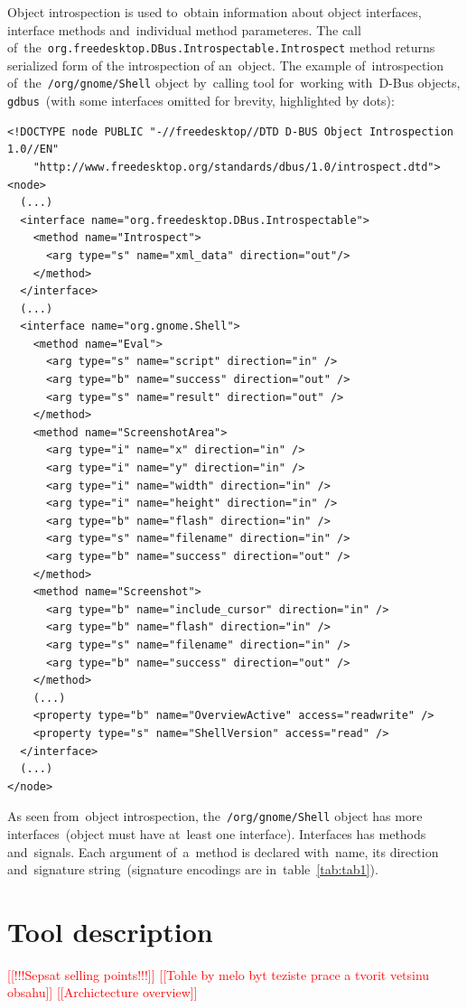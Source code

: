 \documentclass[conference]{IEEEtran}
\newcommand{\addtodo}[1]{\textcolor{red}{[[#1]]}}
\begin{document}
Object introspection is used to~obtain information about object interfaces,
interface methods and~individual method parameteres. The call
of~the~\texttt{org.freedesktop.DBus.Introspectable.Introspect} method returns
serialized form of the introspection of an~object. The example of~introspection
of~the~\texttt{/org/gnome/Shell} object by~calling tool for~working with~D-Bus
objects, \texttt{gdbus}~(with some interfaces omitted for brevity, highlighted
by dots):
\begin{verbatim}
<!DOCTYPE node PUBLIC "-//freedesktop//DTD D-BUS Object Introspection 1.0//EN"
    "http://www.freedesktop.org/standards/dbus/1.0/introspect.dtd">
<node>
  (...)
  <interface name="org.freedesktop.DBus.Introspectable">
    <method name="Introspect">
      <arg type="s" name="xml_data" direction="out"/>
    </method>
  </interface>
  (...)
  <interface name="org.gnome.Shell">
    <method name="Eval">
      <arg type="s" name="script" direction="in" />
      <arg type="b" name="success" direction="out" />
      <arg type="s" name="result" direction="out" />
    </method>
    <method name="ScreenshotArea">
      <arg type="i" name="x" direction="in" />
      <arg type="i" name="y" direction="in" />
      <arg type="i" name="width" direction="in" />
      <arg type="i" name="height" direction="in" />
      <arg type="b" name="flash" direction="in" />
      <arg type="s" name="filename" direction="in" />
      <arg type="b" name="success" direction="out" />
    </method>
    <method name="Screenshot">
      <arg type="b" name="include_cursor" direction="in" />
      <arg type="b" name="flash" direction="in" />
      <arg type="s" name="filename" direction="in" />
      <arg type="b" name="success" direction="out" />
    </method>
    (...)
    <property type="b" name="OverviewActive" access="readwrite" />
    <property type="s" name="ShellVersion" access="read" />
  </interface>
  (...)
</node>
\end{verbatim}

As seen from~object introspection, the~\texttt{/org/gnome/Shell} object has more
interfaces~(object must have at~least one interface). Interfaces has methods
and~signals. Each argument of~a~method is declared with~name, its direction
and~signature string~(signature encodings are in~table~\ref{tab:tab1}).


\section{Tool description}
\addtodo{!!!Sepsat selling points!!!}
\addtodo{Tohle by melo byt teziste prace a tvorit vetsinu obsahu}
\addtodo{Archictecture overview}
\end{document}
